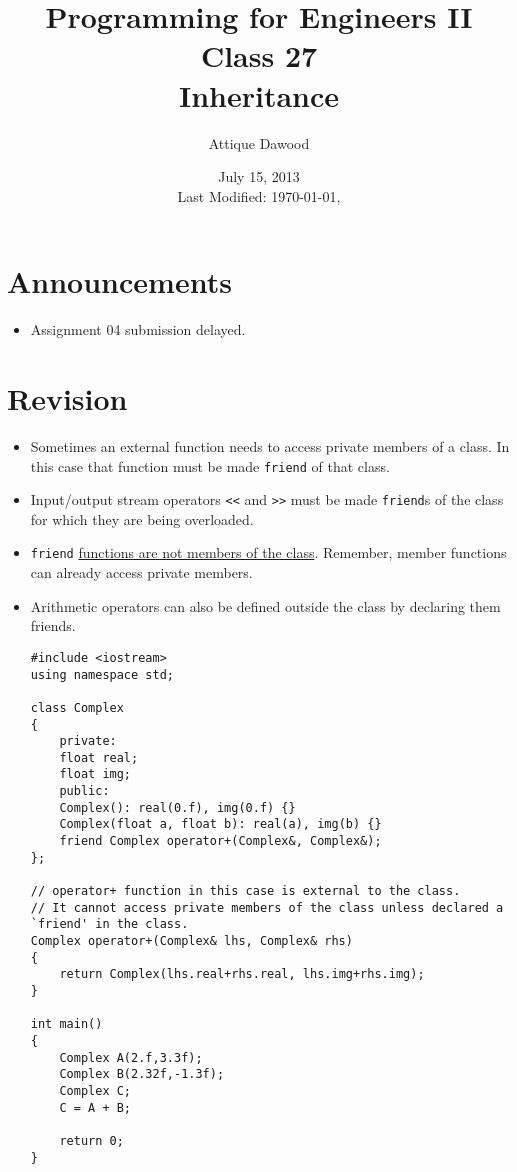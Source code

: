 \documentclass[12pt,a4paper]{article}
\title{\vspace{-2cm}Programming for Engineers II\\Class 27\\Inheritance}
\author{Attique Dawood}
\date{July 15, 2013\\[0.2cm] Last Modified: \today, \currenttime}
\begin{document}
\maketitle
\section{Announcements}
\begin{itemize}
\item Assignment 04 submission delayed.
\end{itemize}
\section{Revision}
\begin{itemize}
\item Sometimes an external function needs to access private members of a class. In this case that function must be made \verb|friend| of that class.
\item Input/output stream operators \verb|<<| and \verb|>>| must be made \verb|friend|s of the class for which they are being overloaded.
\item \verb|friend| \underline{functions are not members of the class}. Remember, member functions can already access private members.
\item Arithmetic operators can also be defined outside the class by declaring them friends.
\begin{lstlisting}[caption={operator+ implemented as \texttt{friend}}]
#include <iostream>
using namespace std;

class Complex
{
	private:
	float real;
	float img;
	public:
	Complex(): real(0.f), img(0.f) {}
	Complex(float a, float b): real(a), img(b) {}
	friend Complex operator+(Complex&, Complex&);
};

// operator+ function in this case is external to the class.
// It cannot access private members of the class unless declared a `friend' in the class.
Complex operator+(Complex& lhs, Complex& rhs)
{
	return Complex(lhs.real+rhs.real, lhs.img+rhs.img);
}

int main()
{
	Complex A(2.f,3.3f);
	Complex B(2.32f,-1.3f);
	Complex C;
	C = A + B;

	return 0;
}
\end{lstlisting}
\end{itemize}
\end{document}

